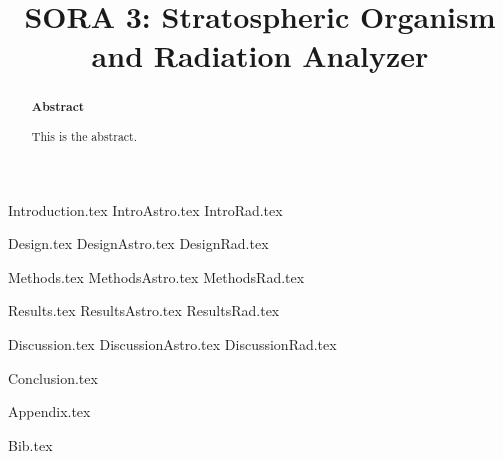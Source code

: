 \documentclass[aps,superscriptaddress,floatfix,nofootinbib,showpacs,amsmath,amssymb,altaffilletter,floatfix,onecolumn]{revtex4-1}
\begin{document}
\title{SORA 3: Stratospheric Organism and Radiation Analyzer}

\begin{abstract}
\begin{center}
{\bf Abstract}
\end{center}
\frenchspacing

This is the abstract.

\newpage %
\end{abstract}

\setlength{\parindent}{1em}
\setdefaultleftmargin{1em}{1em}{}{}{}{}
\setcounter{page}{0}\thispagestyle{empty}
\maketitle
\onecolumngrid
\setcounter{tocdepth}{2}
\setcounter{page}{0}\thispagestyle{empty}
\tableofcontents
\setcounter{page}{0}\thispagestyle{empty}
\newpage
\onecolumngrid

{Introduction.tex}
{IntroAstro.tex}
{IntroRad.tex}

{Design.tex}
{DesignAstro.tex}
{DesignRad.tex}

{Methods.tex}
{MethodsAstro.tex}
{MethodsRad.tex}

{Results.tex} 
{ResultsAstro.tex} 
{ResultsRad.tex} 

{Discussion.tex}
{DiscussionAstro.tex}
{DiscussionRad.tex}

{Conclusion.tex} 
\newpage

{Appendix.tex}
\newpage

{Bib.tex}

\clearpage

\end{document}
